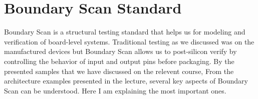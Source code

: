 \documentclass[12pt, a4paper, twocolumn]{article}
\begin{document}
\section{Boundary Scan Standard}
Boundary Scan is a structural testing standard that helps us for modeling and verification of board-level systems.
Traditional testing as we discussed was on the manufactured devices but Boundary Scan allows us to post-silicon verify by controlling the behavior of input and output pins before packaging.
By the presented samples that we have discussed on the relevent course, From the architecture examples presented in the lecture, several key aspects of Boundary Scan can be understood.
Here I am explaining the most important ones.
\end{document}

